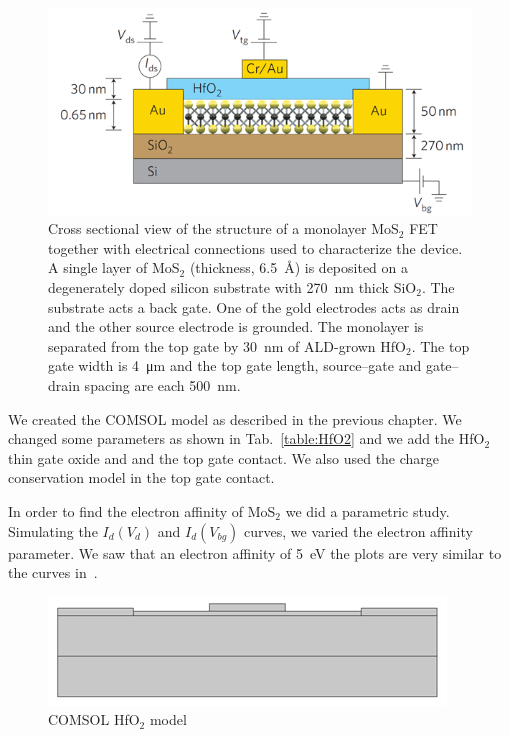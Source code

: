 \documentclass[12pt,a4paper,titlepage]{article}
\begin{document}
\begin{figure}[h]
	\centering
	\includegraphics[width=1\textwidth]{Immagini/HfO2_model.png} 
	\caption{Cross sectional view of the structure of a monolayer MoS$_2$ FET together with electrical connections used to characterize the device. A single layer of MoS$_2$ (thickness, \SI{6.5}{\angstrom}) is deposited on a degenerately doped silicon substrate with \SI{270}{\nano \meter} thick SiO$_2$. The substrate acts a back gate. One of the gold electrodes acts as drain and the other source electrode is grounded. The monolayer is separated from the top gate by \SI{30}{\nano \meter} of ALD-grown HfO$_2$. The top gate width is \SI{4}{\micro \meter} and the top gate length, source–gate and gate–drain spacing are each \SI{500}{\nano \meter}.~\cite{Radisavljevic:Si_MoS2}}
	\label{fig:HfO2_model}
\end{figure} 

We created the COMSOL model as described in the previous chapter. We changed some parameters as shown in Tab.~\ref{table:HfO2} and we add the HfO$_2$ thin gate oxide and and the top gate contact. We also used the charge conservation model in the top gate contact. 

In order to find the electron affinity of MoS$_2$ we did a parametric study. Simulating the $I_d(V_d)$ and $I_d(V_{bg})$ curves, we varied the electron affinity parameter. We saw that an electron affinity of \SI{5}{\electronvolt} the plots are very similar to the curves in~\cite{Radisavljevic:Si_MoS2}.

\begin{figure}[H]
	\centering
	\includegraphics[width=.8\textwidth]{Immagini/HfO2_model_comsol.png} 
	\caption{COMSOL HfO$_2$ model}
	\label{fig:HfO2_model_comsol}
\end{figure} 
	
\end{document}
